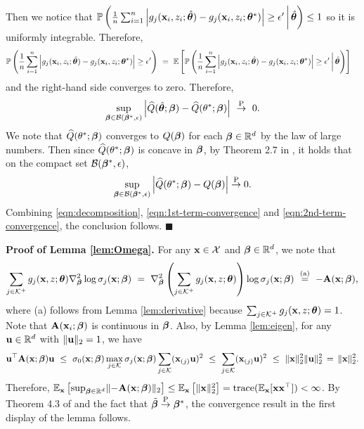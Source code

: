 Then we notice that $\mathbb{P}\left(
\frac{1}{n}\sum_{i=1}^n\left|
    g_j(\mathbf{x}_i, z_i; \hat{\bm{\theta}}) - g_j(\mathbf{x}_i, z_i; {\bm{\theta}}^*)
    \right| \geq \epsilon' \,\bigg|\, \hat{\bm{\theta}}
\right) \leq 1$ so it is uniformly integrable. 
Therefore,
\begin{align*}
    & \mathbb{P}\left(
\frac{1}{n}\sum_{i=1}^n\left|
    g_j(\mathbf{x}_i, z_i; \hat{\bm{\theta}}) - g_j(\mathbf{x}_i, z_i; {\bm{\theta}}^*)
    \right| \geq \epsilon' 
\right) ~=~\mathbb{E}\left[\mathbb{P}\left(
\frac{1}{n}\sum_{i=1}^n\left|
    g_j(\mathbf{x}_i, z_i; \hat{\bm{\theta}}) - g_j(\mathbf{x}_i, z_i; {\bm{\theta}}^*)
    \right| \geq \epsilon' \,\bigg|\, \hat{\bm{\theta}}
\right)\right]
\end{align*}
and the right-hand side converges to zero. 
Therefore, 
\begin{align}
\label{eqn:1st-term-convergence}
    \sup_{\bm{\beta} \in \mathcal{B}(\bm{\beta}^*, \epsilon)}
    \left|
    \widehat{Q}(\hat{\bm{\theta}};\bm{\beta}) -  \widehat{Q}({\theta}^*;\bm{\beta})
    \right|~\overset{\text{\upshape{P}}}{\rightarrow}~ 0.
\end{align}
We note that $ \widehat{Q}({\theta}^*;\bm{\beta})$ converges to ${Q}(\bm{\beta})$ for each $\bm{\beta} \in \mathbb{R}^d$ by the law of large numbers. 
Then since $\widehat{Q}({\theta}^*;\bm{\beta})$ is concave in $\bm{\beta}$, by Theorem 2.7 in \cite{newey1994large}, it holds that on the compact set 
$\mathcal{B}(\bm{\beta}^*, \epsilon)$, 
\begin{align}
\label{eqn:2nd-term-convergence}
    \sup_{\bm{\beta} \in \mathcal{B}(\bm{\beta}^*, \epsilon)}
    \left|
    \widehat{Q}({\theta}^*;\bm{\beta}) - {Q}(\bm{\beta})
    \right| \overset{\text{\upshape{P}}}{\rightarrow} 0.
\end{align}
Combining \eqref{eqn:decomposition}, \eqref{eqn:1st-term-convergence} and \eqref{eqn:2nd-term-convergence}, the conclusion follows. 
\hfill $\blacksquare$
\vspace{3mm}

\noindent
\textbf{Proof of Lemma \ref{lem:Omega}.}
For any $\mathbf{x} \in \mathcal{X}$ and $\bm{\beta} \in \mathbb{R}^{d}$, we note that 
$$
\sum_{j\in \mathcal{K}^+} g_j(\mathbf{x}, z;{\bm{\theta}})
\nabla^2_{\bm{\beta}}\log \sigma_j(\mathbf{x}; {\bm{\beta}})~=~
\nabla^2_{\bm{\beta}}\left(\sum_{j\in \mathcal{K}^+} 
g_j(\mathbf{x}, z;{\bm{\theta}})
\right)\log \sigma_j(\mathbf{x}; {\bm{\beta}})
~\stackrel{\text{(a)}}{=}~ -\mathbf{A}(\mathbf{x}; \bm{\beta}),$$
where (a) follows from Lemma \ref{lem:derivative} because $\sum_{j\in \mathcal{K}^+} g_j(\mathbf{x}, z;{\bm{\theta}}) = 1$. 
Note that $\mathbf{A}(\mathbf{x}_i;{\bm{\beta}})$ is continuous in ${\bm{\beta}}$.
Also, by Lemma \ref{lem:eigen}, for any $\mathbf{u} \in \mathbb{R}^{d}$  with $\Vert \mathbf{u} \rVert_2 = 1$, we have
$$
\mathbf{u}^{\top}\mathbf{A}(\mathbf{x}; \bm{\beta})\mathbf{u} ~\leq~ \sigma_{0}(\mathbf{x}; \bm{\beta})\max_{j\in \mathcal{K}}\sigma_{j}(\mathbf{x}; \bm{\beta})\sum_{j\in \mathcal{K}}(\mathbf{x}_{(j)} \mathbf{u})^2~\leq~ \sum_{j\in \mathcal{K}}(\mathbf{x}_{(j)} \mathbf{u})^2~\leq ~\lVert \mathbf{x} \rVert_2^2 \Vert \mathbf{u} \rVert_2^2 \,=\, \lVert \mathbf{x} \rVert_2^2.
$$
Therefore, $\mathbb{E}_{\mathbf{x}}\left[\sup_{\bm{\beta}\in \mathbb{R}^{d}} \lVert - \mathbf{A}(\mathbf{x}; \bm{\beta}) \rVert_2\right] \leq \mathbb{E}_{\mathbf{x}}\left[\lVert \mathbf{x} \rVert_2^2\right] = \text{trace}(\mathbb{E}_{\mathbf{x}}[\mathbf{x} \mathbf{x}^{\top}]) < \infty$.
By Theorem 4.3 of \cite{newey1994large} and the fact that $\tilde{\bm{\beta}} \overset{\text{\upshape{P}}}{\rightarrow} \bm{\beta}^*$, the convergence result in the first display of the lemma follows. 

